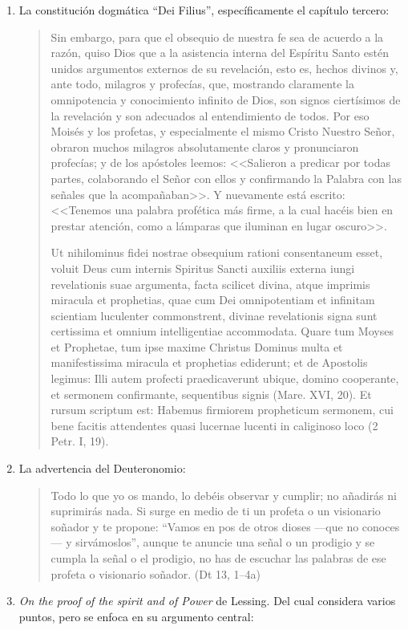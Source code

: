 \begin{enumerate}
\item La constitución dogmática \enquote{Dei Filius}, específicamente el
  capítulo tercero: \blockquote[Ut nihilominus fidei nostrae obsequium rationi
  consentaneum esset, voluit Deus cum internis Spiritus Sancti auxiliis externa
  iungi revelationis suae argumenta, facta scilicet divina, atque imprimis
  miracula et prophetias, quae cum Dei omnipotentiam et infinitam scientiam
  luculenter commonstrent, divinae revelationis signa sunt certissima et omnium
  intelligentiae accommodata. Quare tum Moyses et Prophetae, tum ipse maxime
  Christus Dominus multa et manifestissima miracula et prophetias ediderunt; et
  de Apostolis legimus: Illi autem profecti praedicaverunt ubique, domino
  cooperante, et sermonem confirmante, sequentibus signis (Mare. XVI, 20). Et
  rursum scriptum est: Habemus firmiorem propheticum sermonem, cui bene facitis
  attendentes quasi lucernae lucenti in caliginoso loco (2 Petr. I, 19).]{Sin
    embargo, para que el obsequio de nuestra fe sea de acuerdo a la razón, quiso
    Dios que a la asistencia interna del Espíritu Santo estén unidos argumentos
    externos de su revelación, esto es, hechos divinos y, ante todo, milagros y
    profecías, que, mostrando claramente la omnipotencia y conocimiento infinito
    de Dios, son signos ciertísimos de la revelación y son adecuados al
    entendimiento de todos. Por eso Moisés y los profetas, y especialmente el
    mismo Cristo Nuestro Señor, obraron muchos milagros absolutamente claros y
    pronunciaron profecías; y de los apóstoles leemos: <<Salieron a predicar por
    todas partes, colaborando el Señor con ellos y confirmando la Palabra con
    las señales que la acompañaban>>. Y nuevamente está escrito: <<Tenemos una
    palabra profética más firme, a la cual hacéis bien en prestar atención, como
    a lámparas que iluminan en lugar oscuro>>.}
\item La advertencia del Deuteronomio: \blockquote{Todo lo que yo os mando, lo
    debéis observar y cumplir; no añadirás ni suprimirás nada. Si surge en medio
    de ti un profeta o un visionario soñador y te propone: \enquote{Vamos en pos
      de otros dioses ---que no conoces--- y sirvámoslos}, aunque te anuncie una
    señal o un prodigio y se cumpla la señal o el prodigio, no has de escuchar
    las palabras de ese profeta o visionario soñador. (Dt 13, 1--4a)}
\item \emph{On the proof of the spirit and of Power} de Lessing. Del cual
  considera varios puntos, pero se enfoca en su argumento central:

\end{enumerate}
